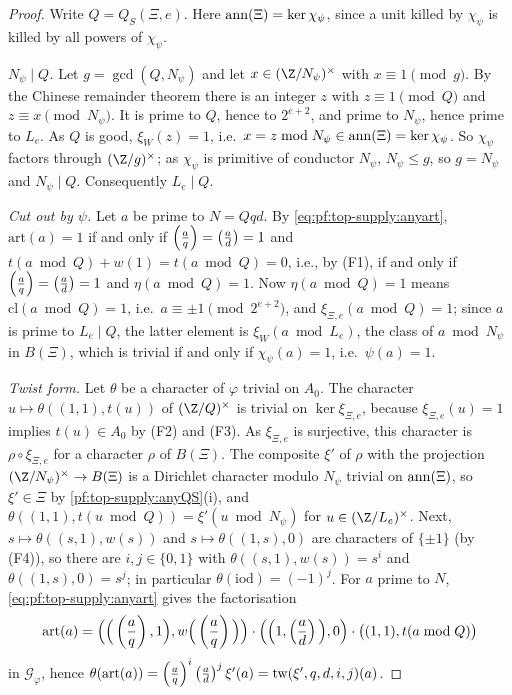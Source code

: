 \begin{proof}
Write $Q=Q_S(\Xi,e)$. Here $\operatorname{ann}(\Xi)=\ker\chi_\psi$, since a unit killed by $\chi_\psi$ is killed by all powers
of $\chi_\psi$.

\emph{$N_\psi\mid Q$.} Let $g=\gcd(Q,N_\psi)$ and let $x\in(\Z/N_\psi)^\times$ with $x\equiv1\pmod g$. By the Chinese
remainder theorem there is an integer $z$ with $z\equiv1\pmod Q$ and $z\equiv x\pmod{N_\psi}$. It is prime to $Q$, hence
to $2^{e+2}$, and prime to $N_\psi$, hence prime to $L_e$. As $Q$ is good, $\xi_W(z)=1$, i.e.\
$x=z\bmod N_\psi\in\operatorname{ann}(\Xi)=\ker\chi_\psi$. So $\chi_\psi$ factors through $(\Z/g)^\times$; as $\chi_\psi$ is
primitive of conductor $N_\psi$, $N_\psi\le g$, so $g=N_\psi$ and $N_\psi\mid Q$. Consequently $L_e\mid Q$.

\emph{Cut out by $\psi$.} Let $a$ be prime to $N=Qqd$. By \eqref{eq:pf:top-supply:anyart}, $\mathrm{art}(a)=1$ if and only if
$\left(\frac{a}{q}\right)=\left(\frac{a}{d}\right)=1$ and $t(a\bmod Q)+w(1)=t(a\bmod Q)=0$, i.e., by (F1), if and only if
$\left(\frac{a}{q}\right)=\left(\frac{a}{d}\right)=1$ and $\eta(a\bmod Q)=1$. Now $\eta(a\bmod Q)=1$ means $\mathrm{cl}(a\bmod Q)=1$, i.e.\
$a\equiv\pm1\pmod{2^{e+2}}$, and $\xi_{\Xi,e}(a\bmod Q)=1$; since $a$ is prime to $L_e\mid Q$, the latter element is
$\xi_W(a\bmod L_e)$, the class of $a\bmod N_\psi$ in $B(\Xi)$, which is trivial if and only if $\chi_\psi(a)=1$, i.e.\
$\psi(a)=1$.

\emph{Twist form.} Let $\theta$ be a character of $\varphi$ trivial on $A_0$. The character $u\mapsto\theta((1,1),t(u))$ of
$(\Z/Q)^\times$ is trivial on $\ker\xi_{\Xi,e}$, because $\xi_{\Xi,e}(u)=1$ implies $t(u)\in A_0$ by (F2) and (F3). As
$\xi_{\Xi,e}$ is surjective, this character is $\rho\circ\xi_{\Xi,e}$ for a character $\rho$ of $B(\Xi)$. The composite
$\xi'$ of $\rho$ with the projection $(\Z/N_\psi)^\times\to B(\Xi)$ is a Dirichlet character modulo $N_\psi$ trivial on
$\operatorname{ann}(\Xi)$, so $\xi'\in\Xi$ by \cref{pf:top-supply:anyQS}(i), and $\theta((1,1),t(u\bmod Q))=\xi'(u\bmod N_\psi)$
for $u\in(\Z/L_e)^\times$. Next, $s\mapsto\theta((s,1),w(s))$ and $s\mapsto\theta((1,s),0)$ are characters of $\{\pm1\}$
(by (F4)), so there are $i,j\in\{0,1\}$ with $\theta((s,1),w(s))=s^i$ and $\theta((1,s),0)=s^j$; in particular
$\theta(\mathrm{iod})=(-1)^j$. For $a$ prime to $N$, \eqref{eq:pf:top-supply:anyart} gives the factorisation
\[
\mathrm{art}(a)=\Big(\Big(\left(\frac{a}{q}\right),1\Big),w\Big(\left(\frac{a}{q}\right)\Big)\Big)\cdot\Big(\Big(1,\left(\frac{a}{d}\right)\Big),0\Big)
\cdot\big((1,1),t(a\bmod Q)\big)
\]
in $\mathcal G_\varphi$, hence
$\theta(\mathrm{art}(a))=\left(\frac{a}{q}\right)^i\left(\frac{a}{d}\right)^j\xi'(a)=\operatorname{tw}(\xi',q,d,i,j)(a)$.
\end{proof}

